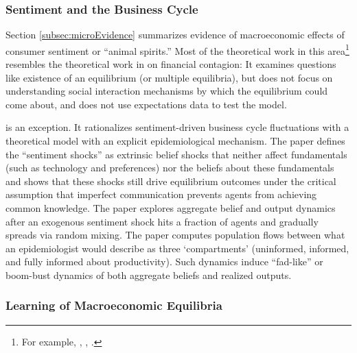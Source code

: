 \subsubsection{Sentiment and the Business Cycle}

Section \ref{subsec:microEvidence} summarizes evidence of macroeconomic effects of consumer sentiment or ``animal spirits.''  Most of the theoretical work in this area\footnote{For example, \cite{angeletos2010noisy}, \cite{benhabib2015sentiments}, \cite{angeletos2018quantifying}.}  resembles the theoretical work in on financial contagion:  It examines questions like existence of an equilibrium (or multiple equilibria), but does not focus on understanding social interaction mechanisms by which the equilibrium could come about, and does not use expectations data to test the model.

\cite{angeletos2013sentiments} is an exception.  It rationalizes sentiment-driven business cycle fluctuations with a theoretical model with an explicit epidemiological mechanism. The paper defines the ``sentiment shocks'' as extrinsic belief shocks that neither affect fundamentals (such as technology and preferences) nor the beliefs about these fundamentals and shows that these shocks still drive equilibrium outcomes under the critical assumption that imperfect communication prevents agents from achieving common knowledge.  The paper explores aggregate belief and output dynamics after an exogenous sentiment shock hits a fraction of agents and gradually spreads via random mixing.  The paper computes  population flows between what an epidemiologist would describe as three `compartments' (uninformed, informed, and fully informed about productivity). Such dynamics induce ``fad-like'' or boom-bust dynamics of both aggregate beliefs and realized outputs.


\subsubsection{Learning of Macroeconomic Equilibria}


